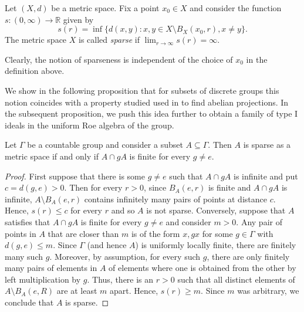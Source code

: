 \documentclass[12pt, a4paper, oneside]{amsart}
\newcommand{\0}{\mathbf{0}}
\newcommand{\1}{\mathbf{1}}
\newcommand{\R}{\mathbb{R}}   %
\begin{document}
	\begin{definition}
		Let \((X, d)\) be a metric space. Fix a point \(x_0 \in X\) and consider the function \(s \colon (0, \infty) \to \R\) given by 
		\[s(r) = \inf \{d(x, y) : x, y \in X \setminus B_X(x_0, r), x \neq y\}.\]
		The metric space \(X\) is called \textit{sparse} if \(\lim_{r \to \infty} s(r) = \infty.\)
	\end{definition}
	
	\begin{remark}
		Clearly, the notion of sparseness is independent of the choice of \(x_0\) in the definition above. 
	\end{remark}
	
	We show in the following proposition that for subsets of discrete groups this notion coincides with a property studied used in \cite{kellerhals} to find abelian projections. In the subsequent proposition, we push this idea further to obtain a family of type I ideals in the uniform Roe algebra of the group. 
	
	\begin{lemma}
		Let \(\Gamma\) be a countable group and consider a subset \(A \subseteq \Gamma\). Then \(A\) is sparse as a metric space if and only if \(A \cap g A\) is finite for every \(g \neq e\). 
	\end{lemma}
	
	\begin{proof}
		First suppose that there is some \(g \neq e\) such that \(A \cap gA\) is infinite and put \(c = d(g, e) > 0\). Then for every \(r > 0\), since \(B_A(e, r)\) is finite and \(A \cap gA\) is infinite, \(A \setminus B_A(e, r)\) contains infinitely many pairs of points at distance \(c\). Hence, \(s(r) \leq c\) for every \(r\) and so \(A\) is not sparse. Conversely, suppose that \(A\) satisfies that \(A \cap gA\) is finite for every \(g \neq e\) and consider \(m > 0\). Any pair of points in \(A\) that are closer than \(m\) is of the form \(x, gx\) for some \(g \in \Gamma\) with \(d(g, e) \leq m\). Since \(\Gamma\) (and hence \(A\)) is uniformly locally finite, there are finitely many such \(g\). Moreover, by assumption, for every such \(g\), there are only finitely many pairs of elements in \(A\) of elements where one is obtained from the other by left multiplication by \(g\). Thus, there is an \(r > 0\) such that all distinct elements of \(A \setminus B_A(e, R)\) are at least \(m\) apart. Hence, \(s(r) \geq m\). Since \(m\) was arbitrary, we conclude that \(A\) is sparse. 
	\end{proof}
	
\end{document}
